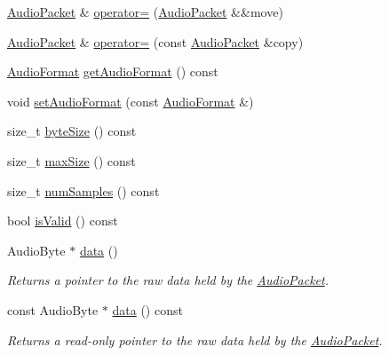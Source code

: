 \begin{DoxyCompactItemize}
\item 
\hyperlink{class_d_x_1_1_audio_1_1_audio_packet}{Audio\-Packet} \& \hyperlink{class_d_x_1_1_audio_1_1_audio_packet_a8fe0f4f40e27254a64999186199533b6}{operator=} (\hyperlink{class_d_x_1_1_audio_1_1_audio_packet}{Audio\-Packet} \&\&move)
\item 
\hyperlink{class_d_x_1_1_audio_1_1_audio_packet}{Audio\-Packet} \& \hyperlink{class_d_x_1_1_audio_1_1_audio_packet_a9a18c4601eff6961aeeccfa799a11575}{operator=} (const \hyperlink{class_d_x_1_1_audio_1_1_audio_packet}{Audio\-Packet} \&copy)
\item 
\hyperlink{struct_d_x_1_1_audio_1_1_audio_format}{Audio\-Format} \hyperlink{class_d_x_1_1_audio_1_1_audio_packet_a6f47aa2be747ce054c5c68d723fbf64b}{get\-Audio\-Format} () const 
\item 
void \hyperlink{class_d_x_1_1_audio_1_1_audio_packet_a6d3120521532e6cd050b517ebed8f263}{set\-Audio\-Format} (const \hyperlink{struct_d_x_1_1_audio_1_1_audio_format}{Audio\-Format} \&)
\item 
size\-\_\-t \hyperlink{class_d_x_1_1_audio_1_1_audio_packet_a21f03d6b228c4ef5f3a85109b5e537a5}{byte\-Size} () const 
\item 
size\-\_\-t \hyperlink{class_d_x_1_1_audio_1_1_audio_packet_aa3e1275d86a76f1d42d4d5a4b6213e5f}{max\-Size} () const 
\item 
size\-\_\-t \hyperlink{class_d_x_1_1_audio_1_1_audio_packet_a2f98b04776946df7c3ccb4a0e5b80ce4}{num\-Samples} () const 
\item 
bool \hyperlink{class_d_x_1_1_audio_1_1_audio_packet_a75854e87ae3c4ce04503a75d42219ca5}{is\-Valid} () const 
\item 
Audio\-Byte $\ast$ \hyperlink{class_d_x_1_1_audio_1_1_audio_packet_ab93eafc041e06976f99fad9d21cc19e3}{data} ()
\begin{DoxyCompactList}\small\item\em Returns a pointer to the raw data held by the \hyperlink{class_d_x_1_1_audio_1_1_audio_packet}{Audio\-Packet}. \end{DoxyCompactList}\item 
const Audio\-Byte $\ast$ \hyperlink{class_d_x_1_1_audio_1_1_audio_packet_a24b0feecae93675256e4edb05cebe3fe}{data} () const 
\begin{DoxyCompactList}\small\item\em Returns a read-\/only pointer to the raw data held by the \hyperlink{class_d_x_1_1_audio_1_1_audio_packet}{Audio\-Packet}. \end{DoxyCompactList}\item 

\end{DoxyCompactItemize}
